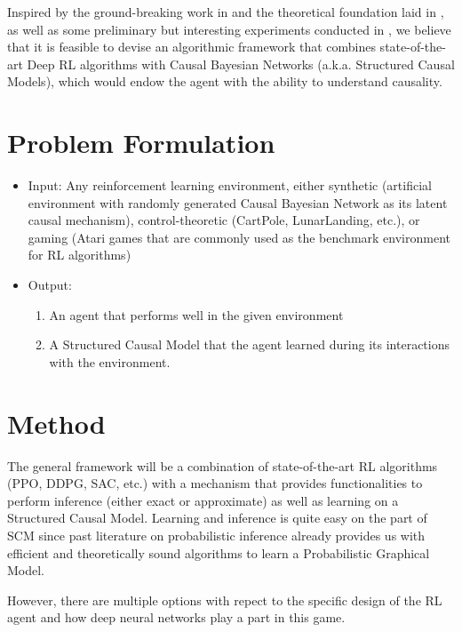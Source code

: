 \documentclass{article}
\begin{document}
Inspired by the ground-breaking work in \cite{buesing2018woulda} and the theoretical foundation laid in \cite{2018arXiv180701268G}, as well as some preliminary but interesting experiments conducted in \cite{2019arXiv190108162D}, we believe that it is feasible to devise an algorithmic framework that combines state-of-the-art Deep RL algorithms with Causal Bayesian Networks (a.k.a. Structured Causal Models), which would endow the agent with the ability to understand causality.

\section{Problem Formulation}

\begin{itemize}
  \item Input: 
  Any reinforcement learning environment, either synthetic (artificial environment with randomly generated Causal Bayesian Network as its latent causal mechanism), control-theoretic (CartPole, LunarLanding, etc.), or gaming (Atari games that are commonly used as the benchmark environment for RL algorithms) 
  \item Output: 
    \begin{enumerate}
        \item An agent that performs well in the given environment
        \item A Structured Causal Model that the agent learned during its interactions with the environment. 
    \end{enumerate}
\end{itemize}

\section{Method}

The general framework will be a combination of state-of-the-art RL algorithms (PPO, DDPG, SAC, etc.) with a mechanism that provides functionalities to perform inference (either exact or approximate) as well as learning on a Structured Causal Model. Learning and inference is quite easy on the part of SCM since past literature on probabilistic inference already provides us with efficient and theoretically sound algorithms to learn a Probabilistic Graphical Model. 

However, there are multiple options with repect to the specific design of the RL agent and how deep neural networks play a part in this game. 
\end{document}
